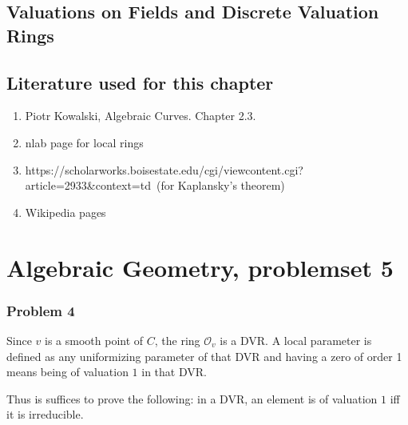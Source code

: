 \section{Valuations on Fields and Discrete Valuation Rings}





\section{Literature used for this chapter}

\begin{enumerate}
    \item Piotr Kowalski, Algebraic Curves. Chapter 2.3.
    \item nlab page for local rings
    \item https://scholarworks.boisestate.edu/cgi/viewcontent.cgi?article=2933&context=td\
          (for Kaplansky's theorem)
    \item Wikipedia pages
\end{enumerate}

\chapter{Algebraic Geometry, problemset 5}

\subsection*{Problem 4}

Since \( v \) is a smooth point of \( C \), the ring \( \mathcal{O}_v \)
is a DVR. A local parameter is defined as any uniformizing parameter
of that DVR and having a zero of order 1 means being of valuation \( 1 \)
in that DVR.

Thus is suffices to prove the following: in a DVR, an element is of valuation
\( 1 \) iff it is irreducible.

